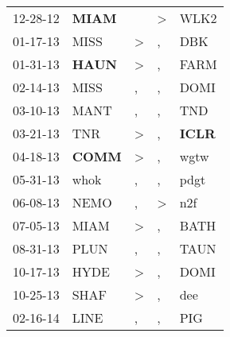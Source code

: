\begin{supertabular}{p{0.07\textwidth}p{0.06\textwidth}p{0.02\textwidth}p{0.02\textwidth}p{0.06\textwidth}}
          12-28-12\textsuperscript{} &  \textbf{MIAM\textsuperscript{}} &                  &     \textgreater &           WLK2\textsuperscript{} \\
          01-17-13\textsuperscript{} &           MISS\textsuperscript{} &     \textgreater &                , &            DBK\textsuperscript{} \\
          01-31-13\textsuperscript{} &  \textbf{HAUN\textsuperscript{}} &     \textgreater &                , &           FARM\textsuperscript{} \\
          02-14-13\textsuperscript{} &           MISS\textsuperscript{} &                , &                , &           DOMI\textsuperscript{} \\
          03-10-13\textsuperscript{} &           MANT\textsuperscript{} &                , &                , &            TND\textsuperscript{} \\
          03-21-13\textsuperscript{} &            TNR\textsuperscript{} &     \textgreater &                , &  \textbf{ICLR\textsuperscript{}} \\
          04-18-13\textsuperscript{} &  \textbf{COMM\textsuperscript{}} &     \textgreater &                , &           wgtw\textsuperscript{} \\
          05-31-13\textsuperscript{} &           whok\textsuperscript{} &                , &                , &           pdgt\textsuperscript{} \\
          06-08-13\textsuperscript{} &           NEMO\textsuperscript{} &                , &     \textgreater &            n2f\textsuperscript{} \\
          07-05-13\textsuperscript{} &           MIAM\textsuperscript{} &     \textgreater &                , &           BATH\textsuperscript{} \\
          08-31-13\textsuperscript{} &           PLUN\textsuperscript{} &                , &                , &           TAUN\textsuperscript{} \\
          10-17-13\textsuperscript{} &           HYDE\textsuperscript{} &     \textgreater &                , &           DOMI\textsuperscript{} \\
          10-25-13\textsuperscript{} &           SHAF\textsuperscript{} &     \textgreater &                , &            dee\textsuperscript{} \\
          02-16-14\textsuperscript{} &           LINE\textsuperscript{} &                , &                , &            PIG\textsuperscript{} \\

\end{supertabular}
